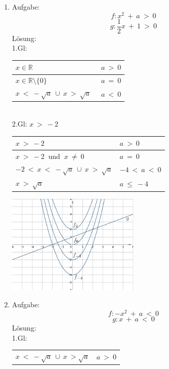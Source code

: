 \begin{enumerate}
\begin{center}
					\end{center}
	\item Aufgabe:
					\[f : x^2 \ + \ a \ > \ 0\]
					\[g : \frac 1 2 x \ + \ 1 \ > \ 0\]
				L\"osung: \\
					1.Gl: \\
						\begin{tabular}{|l|l|}
							\hline $ x \in \mathbb{R} $ & $ a \ > \ 0 $ \\
							\hline $ x \in \mathbb{R} \setminus \lbrace 0 \rbrace $ & $ a \ = \ 0 $ \\
							\hline $ x \ < \ -\sqrt a \ \cup \ x \ > \ \sqrt a \ \  $ & $ a \ < \ 0 $ \\
							\hline
						\end{tabular} \\
					2.Gl: $ x \ > \ -2 $ \\
					\begin{center}
					\begin{tabular}{|l|l|}
						\hline $ x \ > \ -2 $ & $ a \ > \ 0 $ \\
						\hline $ x \ > \ -2 \ $ und $ \ x \ \neq \ 0 $ & $ a \ = \ 0 $ \\
						\hline $ -2 \ < \ x \ < \ -\sqrt a \ \cup \ x \ > \ \sqrt a $ & $ -4 \ < \ a \ < \ 0 $ \\
						\hline $ x \ > \ \sqrt a $ & $ a \ \leq \ -4 $ \\
						\hline
					\end{tabular}
					\end{center}
					\begin{center}
						\includegraphics[width=0.5\textwidth]{img/Aufgaben/Analytisch/A10.PNG}
					\end{center}
	\item Aufgabe:
					\[f : -x^2 \ + \ a \ < \ 0\]
					\[g : x \ + \ a \ < \ 0\]
				L\"osung: \\
					1.Gl: \\
						\begin{tabular}{|l|l|}
							\hline $ x \ < \ -\sqrt a \ \cup \ x \ > \sqrt a $ & $ a \ > \ 0 $ \\

\end{tabular}
\end{enumerate}
